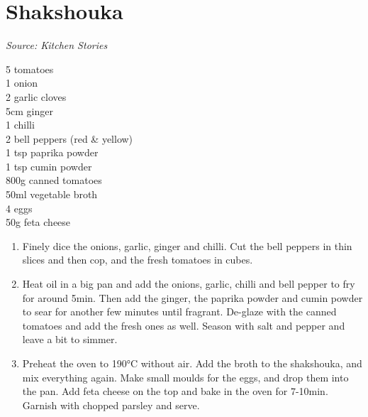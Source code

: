 \documentclass{report}
\begin{document}
\section{Shakshouka}
\textit{Source: Kitchen Stories}\\
\begin{minipage}[t]{0.21\textwidth} \vspace{0pt}
5 tomatoes\\
1 onion\\
2 garlic cloves\\
5cm ginger\\
1 chilli\\
2 bell peppers (red \& yellow)\\
1 tsp paprika powder\\
1 tsp cumin powder\\
800g canned tomatoes\\
50ml vegetable broth\\
4 eggs\\
50g feta cheese
\end{minipage}
\hfill
\begin{minipage}[t]{0.78\textwidth} \vspace{0pt}
	\begin{enumerate}
		\item Finely dice the onions, garlic, ginger and chilli. Cut the bell peppers in thin slices and then cop, and the fresh tomatoes in cubes.
		\item Heat oil in a big pan and add the onions, garlic, chilli and bell pepper to fry for around 5min. Then add the ginger, the paprika powder and cumin powder to sear for another few minutes until fragrant. De-glaze with the canned tomatoes and add the fresh ones as well. Season with salt and pepper and leave a bit to simmer.
		\item Preheat the oven to 190°C without air. Add the broth to the shakshouka, and mix everything again. Make small moulds for the eggs, and drop them into the pan. Add feta cheese on the top and bake in the oven for 7-10min. Garnish with chopped parsley and serve.
	\end{enumerate}	
\end{minipage}
\end{document}
